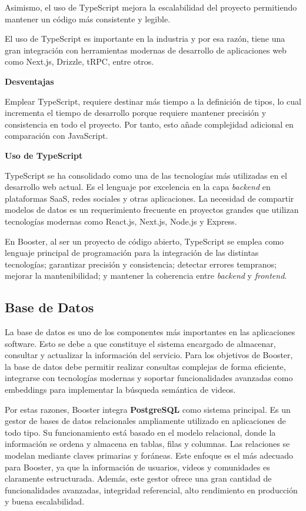 Asimismo, el uso de TypeScript mejora la escalabilidad del proyecto permitiendo mantener un código más consistente y legible. 

El uso de TypeScript es importante en la industria y por esa razón, tiene una gran integración con herramientas modernas de desarrollo de aplicaciones web como Next.js, Drizzle, tRPC, entre otros.

\textbf{Desventajas}

Emplear TypeScript, requiere destinar más tiempo a la definición de tipos, lo cual incrementa el tiempo de desarrollo porque requiere mantener precisión y consistencia en todo el proyecto. Por tanto, esto añade complejidad adicional en comparación con JavaScript.

\textbf{Uso de TypeScript}

TypeScript se ha consolidado como una de las tecnologías más utilizadas en el desarrollo web actual. Es el lenguaje por excelencia en la capa \textit{backend} en plataformas SaaS, redes sociales y otras aplicaciones. La necesidad de compartir modelos de datos es un requerimiento frecuente en proyectos grandes que utilizan tecnologías modernas como React.js, Next.js, Node.js y Express.

En Booster, al ser un proyecto de código abierto, TypeScript se emplea como lenguaje principal de programación para la integración de las distintas tecnologías; garantizar precisión y consistencia; detectar errores tempranos; mejorar la mantenibilidad; y mantener la coherencia entre \textit{backend} y \textit{frontend}.
\subsection{Base de Datos}

La base de datos es uno de los componentes más importantes en las aplicaciones software. Esto se debe a que constituye el sistema encargado de almacenar, consultar y actualizar la información del servicio. Para los objetivos de Booster, la base de datos debe permitir realizar consultas complejas de forma eficiente, integrarse con tecnologías modernas y soportar funcionalidades avanzadas como embeddings para implementar la búsqueda semántica de videos. 

Por estas razones, Booster integra \textbf{PostgreSQL} como sistema principal. Es un gestor de bases de datos relacionales ampliamente utilizado en aplicaciones de todo tipo. Su funcionamiento está basado en el modelo relacional, donde la información se ordena y almacena en tablas, filas y columnas. Las relaciones se modelan mediante claves primarias y foráneas. Este enfoque es el más adecuado para Booster, ya que la información de usuarios, videos y comunidades es claramente estructurada. Además, este gestor ofrece una gran cantidad de funcionalidades avanzadas, integridad referencial, alto rendimiento en producción y buena escalabilidad.


